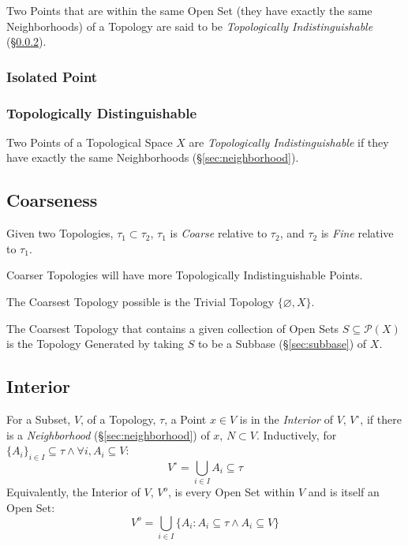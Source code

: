 Two Points that are within the same Open Set (they have exactly the
same Neighborhoods) of a Topology are said to be \emph{Topologically
  Indistinguishable} (\S\ref{sec:topologically_distinguishable}).



\subsubsection{Isolated Point}\label{sec:isolated_point}

\subsubsection{Topologically Distinguishable}
\label{sec:topologically_distinguishable}

Two Points of a Topological Space $X$ are \emph{Topologically
  Indistinguishable} if they have exactly the same Neighborhoods
(\S\ref{sec:neighborhood}).



\subsection{Coarseness}\label{sec:coarseness}

Given two Topologies, $\tau_1 \subset \tau_2$, $\tau_1$ is
\emph{Coarse} relative to $\tau_2$, and $\tau_2$ is \emph{Fine}
relative to $\tau_1$.

Coarser Topologies will have more Topologically Indistinguishable
Points.

The Coarsest Topology possible is the Trivial Topology $\{
\varnothing, X \}$.

The Coarsest Topology that contains a given collection of Open Sets $S
\subseteq \mathcal{P}(X)$ is the Topology Generated by taking $S$ to
be a Subbase (\S\ref{sec:subbase}) of $X$.



\subsection{Interior}\label{sec:interior}

For a Subset, $V$, of a Topology, $\tau$, a Point $x \in V$ is in the
\emph{Interior} of $V$, $V^{\circ}$, if there is a \emph{Neighborhood}
(\S\ref{sec:neighborhood}) of $x$, $N \subset V$. Inductively, for
$\{A_i\}_{i \in I} \subseteq \tau \wedge \forall i, A_i \subseteq V$:
\[
  V^{\circ} = \bigcup_{i \in I} A_i \subseteq \tau
\]
Equivalently, the Interior of $V$, $V^o$, is every Open Set within $V$
and is itself an Open Set:
\[
  V^o = \bigcup_{i \in I} \{ A_i : A_i \subseteq \tau \wedge A_i
  \subseteq V \}
\]



